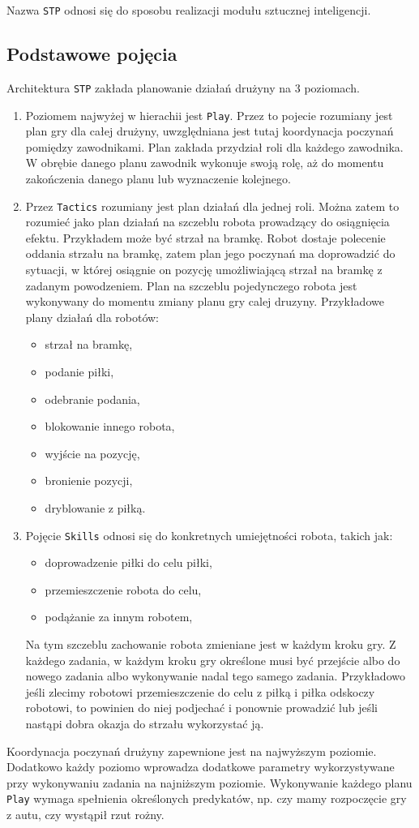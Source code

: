 \documentclass[11pt,onecolumn,a4paper,final]{article}
\begin{document}
Nazwa \texttt{STP} odnosi się do sposobu realizacji modułu sztucznej inteligencji.
\subsection*{Podstawowe pojęcia}
Architektura \texttt{STP} zakłada planowanie działań drużyny na 3 poziomach.
\begin{enumerate}
  \item Poziomem najwyżej w hierachii jest \texttt{Play}. Przez to pojecie rozumiany jest plan gry dla całej drużyny, uwzględniana jest tutaj koordynacja
  poczynań pomiędzy zawodnikami. Plan zakłada przydział roli dla każdego zawodnika. W obrębie danego planu zawodnik wykonuje swoją rolę, aż do momentu
  zakończenia danego planu lub wyznaczenie kolejnego.
  \item Przez \texttt{Tactics} rozumiany jest plan działań dla jednej roli. Można zatem to rozumieć jako plan działań na szczeblu robota prowadzący
 do osiągnięcia efektu. Przykładem może być strzał na bramkę. Robot dostaje polecenie oddania strzału na bramkę, zatem plan jego poczynań ma doprowadzić
 do sytuacji, w której osiągnie on pozycję umożliwiającą strzał na bramkę z zadanym powodzeniem.
 Plan na szczeblu pojedynczego robota jest wykonywany do momentu zmiany planu gry calej druzyny.
 Przykładowe plany działań dla robotów:
 \begin{itemize}
  \item strzał na bramkę,
  \item podanie piłki,
  \item odebranie podania,
  \item blokowanie innego robota,
  \item wyjście na pozycję,
  \item bronienie pozycji,
  \item dryblowanie z piłką.
 \end{itemize}

  \item Pojęcie \texttt{Skills} odnosi się do konkretnych umiejętności robota, takich jak:
    \begin{itemize}
    \item doprowadzenie piłki do celu piłki,
    \item przemieszczenie robota do celu,
    \item podążanie za innym robotem,
    \end{itemize}
  Na tym szczeblu zachowanie robota zmieniane jest w każdym kroku gry. Z każdego zadania, w każdym kroku gry określone musi być przejście
  albo do nowego zadania albo wykonywanie nadal tego samego zadania. Przykładowo jeśli zlecimy robotowi przemieszczenie do celu z piłką i piłka 
  odskoczy robotowi, to powinien do niej podjechać i ponownie prowadzić lub jeśli nastąpi dobra okazja do strzału wykorzystać ją.
 
\end{enumerate}
Koordynacja poczynań drużyny zapewnione jest na najwyższym poziomie. Dodatkowo każdy poziomo wprowadza dodatkowe parametry wykorzystywane przy wykonywaniu
zadania na najniższym poziomie.
Wykonywanie każdego planu \texttt{Play} wymaga spełnienia określonych predykatów, np. czy mamy rozpoczęcie gry z autu, czy wystąpił rzut rożny.
\end{document}
